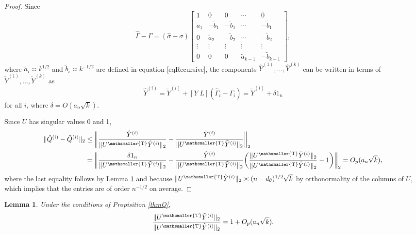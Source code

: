 \documentclass[10pt, reqno]{amsart}
\newtheorem{lemma}{Lemma}[section]
\numberwithin{equation}{section}
\newcommand{\T}{{\mathsmaller {\rm T}}}
\begin{document}
\begin{appendix}
\begin{proof}
	Since
	\[
	\hat{\Gamma} - \Gamma = (\hat{\sigma}-\sigma)\begin{bmatrix}
	1 & 0 & 0 & \cdots & 0 \\
	\tilde a_1 & -\tilde b_1 & -\tilde b_1 &  \cdots & -\tilde b_1 \\
	0 & \tilde a_2 & -\tilde b_2 &  \cdots & -\tilde b_2 \\
	\vdots & \vdots & \vdots & \vdots & \vdots \\
	0 & 0 & 0 & \tilde a_{k-1} & -\tilde b_{k-1}
	\end{bmatrix},
	\]
	where $\tilde a_i \asymp k^{1/2}$ and $\tilde b_i \asymp k^{-1/2}$ are defined in equation \eqref{eqRecursive}, the components $\hat{Y}^{(1)}, \ldots, \hat{Y}^{(k)}$ can be written in terms of $\tilde{Y}^{(1)}, \ldots, \tilde{Y}^{(k)}$ as
	\begin{equation}\label{eqDecompY}
		\hat Y^{(i)}=\tilde{Y}^{(i)} + [Y \; L](\hat{\Gamma}_i - \Gamma_i) = \tilde{Y}^{(i)} + \delta  1_n 
	\end{equation}
	for all $i$, where $\delta=O(a_n \sqrt{k})$. 
	
	Since $U$ has singular values 0 and 1,
	\begin{align*}
		\|\hat Q^{(i)} - \tilde Q^{(i)}\|_2  \leq & \; \biggl\|\frac{\hat Y^{(i)}}{\|U^\T \hat Y^{(i)}\|_2} - \frac{\tilde Y^{(i)}}{\|U^\T \tilde Y^{(i)}\|_2}\biggr\|_2  \\
		= & \; \biggl\| \frac{\delta 1_{n}}{\|U^\T \tilde Y^{(i)}\|_2} - \frac{\hat Y^{(i)}}{\|U^\T \tilde Y^{(i)}\|_2}\biggl(\frac{\|U^\T \tilde Y^{(i)}\|_2}{\|U^\T \hat Y^{(i)}\|_2} -1\biggr)  \biggr\|_2 = O_p (a_n\sqrt{k}),
	\end{align*}
	where the last equality follows by Lemma \ref{lemmaRatio} and because $\|U^\T \tilde{Y}^{(i)}\|_2 \asymp (n-d_\theta)^{1/2}\sqrt{k}$ by orthonormality of the columns of $U$, which implies that the entries are of order $n^{-1/2}$ on average.
	
\end{proof}

\begin{lemma}\label{lemmaRatio}
	Under the conditions of Propisition \ref{thmQ}, 
	\[
	\frac{\|U^\T \tilde Y^{(i)}\|_2}{\|U^\T \hat Y^{(i)}\|_2} = 1 +  O_{p}(a_n \sqrt{k}).
	\]
\end{lemma}


\end{appendix}
\end{document}
